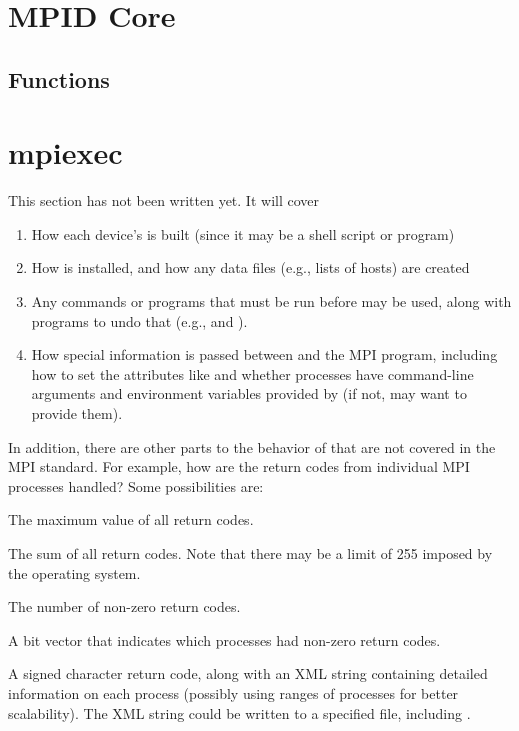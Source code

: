 \documentclass[dvipdfm]{article}
\begin{document}
\section{MPID Core}
%
\subsection{Functions}

%

\section{mpiexec}
This section has not been written yet.  It will cover
\begin{enumerate}
\item How each device's  is built (since it may be a shell
  script or program)
\item How  is installed, and how any data files (e.g., lists of
  hosts) are created
\item Any commands or programs that must be run before  may be
  used, along with programs to undo that (e.g.,  and
  ). 
\item How special information is passed between  and the MPI
  program, including how to set the attributes like  and
  whether processes have command-line arguments and environment variables
  provided by  (if not,  may want to provide
  them). 
\end{enumerate}

In addition, there are other parts to the behavior of 
that are not covered in the MPI standard.  For example, how are the
return codes from individual MPI processes handled?  Some
possibilities are:
\begin{description}
\item The maximum value of all return codes.
\item The sum of all return codes.  Note that there may be
a limit of 255 imposed by the operating system.
\item The number of non-zero return codes.
\item A bit vector that indicates which processes had non-zero return
codes.
\item A signed character return code, along with an XML string
containing detailed information on each process (possibly using ranges
of processes for better scalability).  The XML string could be written
to a specified file, including .
\end{description}
\end{document}
